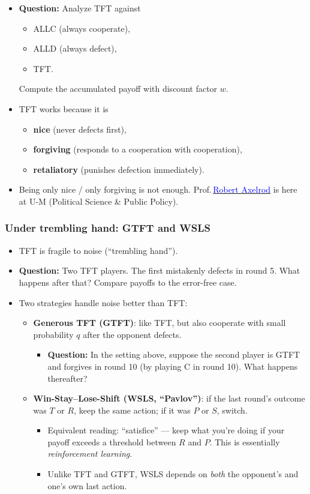 \documentclass[20pt]{extarticle}
\newcommand{\hrefc}[2]{\href{#1}{\textcolor{blue}{#2}}}
\begin{document}
\begin{itemize}
\item \textbf{Question:} Analyze TFT against
	\begin{itemize}
	\item ALLC (always cooperate),
	\item ALLD (always defect),
	\item TFT.
	\end{itemize}
Compute the accumulated payoff with discount factor $w$.
\item TFT works because it is
	\begin{itemize}
	\item \textbf{nice} (never defects first),
	\item \textbf{forgiving} (responds to a cooperation with cooperation),
	\item \textbf{retaliatory} (punishes defection immediately).
	\end{itemize}
\item Being only nice / only forgiving is not enough. Prof.\,\hrefc{https://fordschool.umich.edu/faculty/robert-axelrod}{Robert Axelrod} is here at U-M (Political Science \& Public Policy).
\end{itemize}

\subsubsection*{Under trembling hand: GTFT and WSLS}

\begin{itemize}
\item TFT is fragile to noise (``trembling hand'').
\item \textbf{Question:} Two TFT players. The first mistakenly defects in round 5. What happens after that? Compare payoffs to the error-free case.
\item Two strategies handle noise better than TFT:
	\begin{itemize}
	\item \textbf{Generous TFT (GTFT)}: like TFT, but also cooperate with small probability $q$ after the opponent defects.
		\begin{itemize}
		\item \textbf{Question:} In the setting above, suppose the second player is GTFT and forgives in round 10 (by playing C in round 10). What happens thereafter?
		\end{itemize}
	\item \textbf{Win-Stay--Lose-Shift (WSLS, ``Pavlov'')}: if the last round's outcome was $T$ or $R$, keep the same action; if it was $P$ or $S$, switch.
		\begin{itemize}
		\item Equivalent reading: ``satisfice'' — keep what you're doing if your payoff exceeds a threshold between $R$ and $P$. This is essentially \emph{reinforcement learning}.
		\item Unlike TFT and GTFT, WSLS depends on \emph{both} the opponent's and one's own last action.
		\end{itemize}
	\end{itemize}
\end{itemize}
\end{document}
